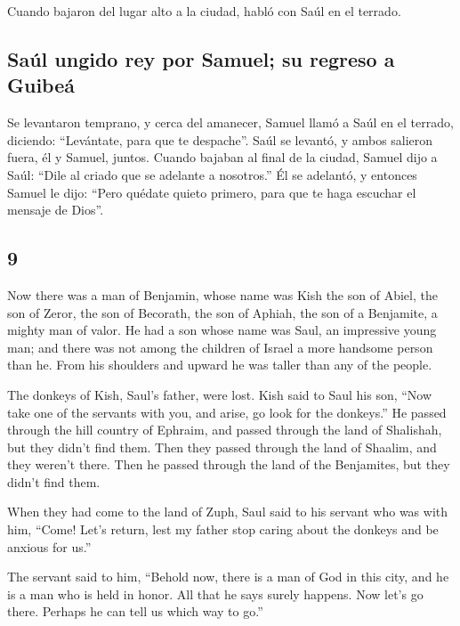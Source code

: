 \begin{paracol}{2}
 Cuando bajaron del lugar alto a la ciudad, habló con
Saúl en el terrado.

\hypertarget{sauxfal-ungido-rey-por-samuel-su-regreso-a-guibeuxe1}{%
\subsection{Saúl ungido rey por Samuel; su regreso a
Guibeá}\label{sauxfal-ungido-rey-por-samuel-su-regreso-a-guibeuxe1}}

 Se levantaron temprano, y cerca del amanecer, Samuel
llamó a Saúl en el terrado, diciendo: ``Levántate, para que te
despache''. Saúl se levantó, y ambos salieron fuera, él y Samuel,
juntos.  Cuando bajaban al final de la ciudad, Samuel
dijo a Saúl: ``Dile al criado que se adelante a nosotros.'' Él se
adelantó, y entonces Samuel le dijo: ``Pero quédate quieto primero, para
que te haga escuchar el mensaje de Dios''.

\switchcolumn
\begin{otherlanguage}{english}

\hypertarget{section-17}{%
\section{9}\label{section-17}}

 Now there was a man of Benjamin, whose name was Kish the
son of Abiel, the son of Zeror, the son of Becorath, the son of Aphiah,
the son of a Benjamite, a mighty man of valor.  He had a
son whose name was Saul, an impressive young man; and there was not
among the children of Israel a more handsome person than he. From his
shoulders and upward he was taller than any of the people.

 The donkeys of Kish, Saul's father, were lost. Kish said
to Saul his son, ``Now take one of the servants with you, and arise, go
look for the donkeys.''  He passed through the hill
country of Ephraim, and passed through the land of Shalishah, but they
didn't find them. Then they passed through the land of Shaalim, and they
weren't there. Then he passed through the land of the Benjamites, but
they didn't find them.

 When they had come to the land of Zuph, Saul said to his
servant who was with him, ``Come! Let's return, lest my father stop
caring about the donkeys and be anxious for us.''

 The servant said to him, ``Behold now, there is a man of
God in this city, and he is a man who is held in honor. All that he says
surely happens. Now let's go there. Perhaps he can tell us which way to
go.''


\end{otherlanguage}
\end{paracol}
